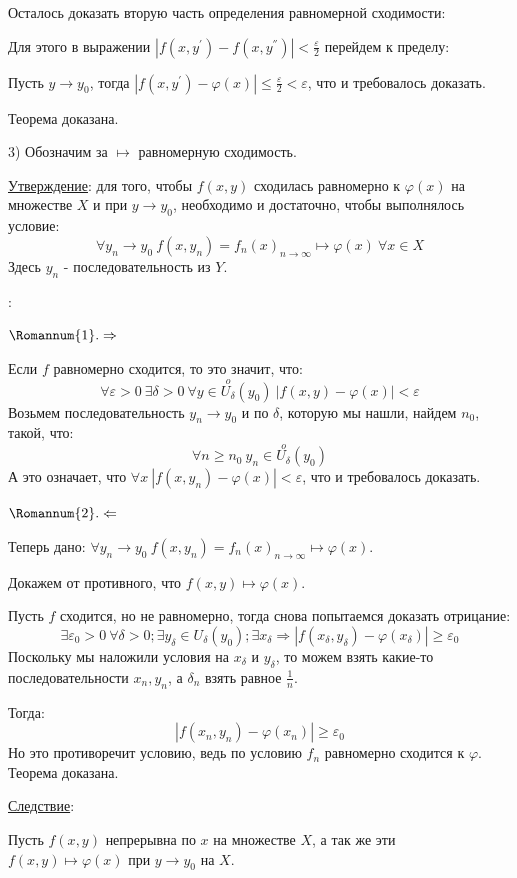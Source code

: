 \documentclass[12pt]{article}
\begin{document}
Осталось доказать вторую часть определения равномерной сходимости:\par
Для этого в выражении $|f(x,y^{'})-f(x,y^{''})| < \frac{\varepsilon}{2}$ перейдем к пределу:\par
Пусть $y \to y_0$, тогда $|f(x,y^{'})-\varphi(x)| \leq \frac{\varepsilon}{2} < \varepsilon$, что и требовалось доказать.\par
Теорема доказана.\par
3) Обозначим за $\mapsto$ равномерную сходимость.\par
\uline{Утверждение}: для того, чтобы $f(x,y)$ сходилась равномерно к $\varphi(x)$ на множестве $X$ и при $y \to y_0$, необходимо и достаточно, чтобы выполнялось условие:
$$\forall y_n \to y_0 \ f(x,y_n) = f_n(x)_{n \to \infty} \mapsto \varphi(x) \ \forall x \in X$$
Здесь $y_n$ - последовательность из $Y$.\par
{}:\par
$\Romannum{1}. \Rightarrow$\par
Если $f$ равномерно сходится, то это значит, что:
$$\forall \varepsilon > 0 \ \exists \delta > 0 \ \forall y \in \overset{o}{U_\delta}(y_0) \ |f(x,y)-\varphi(x)| < \varepsilon$$
Возьмем последовательность $y_n \to y_0$ и по $\delta$, которую мы нашли, найдем $n_0$, такой, что:
$$\forall n \geq n_0 \ y_n \in \overset{o}{U_\delta}(y_0)$$
А это означает, что $\forall x \ |f(x,y_n)-\varphi(x)| < \varepsilon$, что и требовалось доказать.\par
$\Romannum{2}. \Leftarrow$\par
Теперь дано: $\forall y_n \to y_0 \ f(x,y_n) = f_n(x)_{n \to \infty} \mapsto \varphi(x)$.\par
Докажем от противного, что $f(x,y) \mapsto \varphi(x)$.\par
Пусть $f$ сходится, но не равномерно, тогда снова попытаемся доказать отрицание:
$$\exists \varepsilon_0 > 0 \ \forall \delta > 0; \exists y_{\delta} \in U_{\delta} (y_0); \exists x_{\delta} \Rightarrow |f(x_{\delta}, y_{\delta})-\varphi(x_{\delta})| \geq \varepsilon_0$$
Поскольку мы наложили условия на $x_\delta$ и $y_\delta$, то можем взять какие-то последовательности $x_n, y_n$, а $\delta_n$ взять равное $\frac{1}{n}$.\par
Тогда:
$$|f(x_{n}, y_{n})-\varphi(x_{n})| \geq \varepsilon_0$$
Но это противоречит условию, ведь по условию $f_n$ равномерно сходится к $\varphi$. Теорема доказана.\par
\uline{Следствие}:\par
Пусть $f(x,y)$ непрерывна по $x$ на множестве $X$, а так же эти $f(x,y) \mapsto \varphi(x)$ при $y \to y_0$ на $X$.\par
\end{document}
